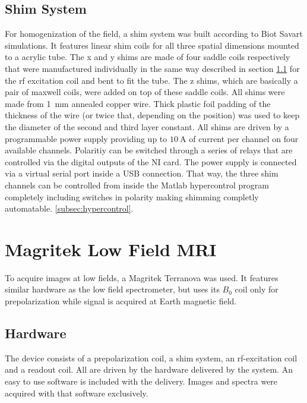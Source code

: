         \subsection{Shim System}
            For homogenization of the field, a shim system was built according to Biot Savart simulations. It features linear shim coils for all three spatial dimensions mounted to a  acrylic tube. The x and y shims are made of four saddle coils respectively that were manufactured individually in the same way described in section \ref{} for the rf excitation coil and bent to fit the tube. The z shims, which are basically a pair of maxwell coils, were added on top of these saddle coils. All shims were made from \SI{1}{\mm} annealed copper wire. Thick plastic foil padding of the thickness of the wire (or twice that, depending on the position) was used to keep the diameter of the second and third layer constant. All shims are driven by a  programmable power supply providing up to $\SI{10}{\ampere}$ of current per channel on four available channels. Polaritiy can be switched through a series of relays that are controlled via the digital outputs of the NI card. The power supply is connected via a virtual serial port inside a USB connection. That way, the three shim channels can be controlled from inside the Matlab hypercontrol program completely including switches in polarity making shimming completly automatable. \ref{subsec:hypercontrol}.
    \section{Magritek Low Field MRI}
            To acquire images at low fields, a Magritek Terranova  was used. It features similar hardware as the low field spectrometer, but uses its $B_0$ coil only for prepolarization while signal is acquired at Earth magnetic field.
        \subsection{Hardware}
            The device consists of a prepolarization coil, a shim system, an rf-excitation coil and a readout coil. All are driven by the hardware delivered by the system. An easy to use software is included with the delivery. Images and spectra were acquired with that software exclusively.
